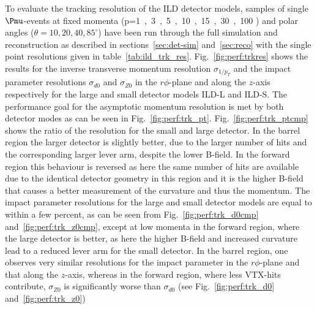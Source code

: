 To evaluate the tracking resolution of the ILD detector models, samples of single $\Pmu$-events at fixed
momenta (p=\unit{1,3,5,10,15,30,100}{\GeV} ) and polar angles ($\theta=10,20,40,85^\circ$) have been
run through the full simulation and reconstruction as described in
sections~\ref{sec:det-sim} and~\ref{sec:reco} with the single point resolutions given in table~\ref{tab:ild_trk_res}.
Fig.~\ref{fig:perf:trkres} shows the results for the inverse transverse momentum resolution
$\sigma_{1/p_T}$ and the impact parameter resolutions $\sigma_{d0}$ and $\sigma_{Z0}$ in the 
$r\phi$-plane and along the $z$-axis respectively for the large and small detector models ILD-L and ILD-S.
The performance goal for the asymptotic momentum resolution is met by both detector modes as can be seen in
Fig.~\ref{fig:perf:trk_pt}. Fig.~\ref{fig:perf:trk_ptcmp} shows the ratio of the resolution for the small
and large detector. In the barrel region the larger detector is slightly better, due to the larger number of hits and
the corresponding larger lever arm, despite the lower B-field. In the forward region this behaviour
is reversed as here the same number of hits are available due to the identical detector geometry in this region
and it is the higher B-field that causes a better measurement of the curvature and thus the momentum.
The impact parameter resolutions for the large and small detector models are equal to within a few percent,
as can be seen from Fig.~\ref{fig:perf:trk_d0cmp} and~\ref{fig:perf:trk_z0cmp}, except at low momenta in the
forward region, where the large detector is better, as here the higher B-field and increased curvature
lead to a reduced lever arm for the small detector.
In the barrel region, one observes very similar resolutions for the impact parameter in the $r\phi$-plane
and that along the $z$-axis, whereas in the forward region, where less VTX-hits contribute, $\sigma_{Z0}$
is significantly worse than  $\sigma_{d0}$ (see Fig.~\ref{fig:perf:trk_d0} and~\ref{fig:perf:trk_z0})
%
% 
